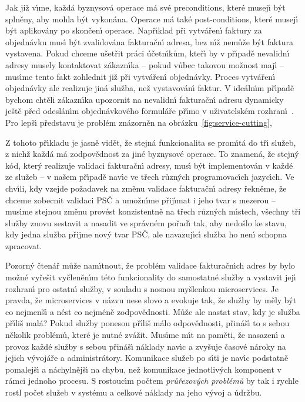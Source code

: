 Jak již v\'{\i}me, každá byznysová operace má své preconditions, které musej\'{\i} b\'yt splněny,
aby mohla b\'yt vykonána. Operace má také post-conditions, které musej\'{\i} b\'yt
aplikovány po skončen\'{\i} operace. Např\'{\i}klad při vytvářen\'{\i} faktury za
objednávku mus\'{\i} b\'yt zvalidována fakturačn\'{\i} adresa, bez n\'{\i}ž nemůže
b\'yt faktura vystavena. Pokud chceme ušetřit práci účetn\'{\i}kům, kteř\'{\i} by
v př\'{\i}padě nevalidn\'{\i} adresy musely kontaktovat zákazn\'{\i}ka – pokud vůbec
takovou možnost maj\'{\i} – mus\'{\i}me tento fakt zohlednit již při vytvářen\'{\i} objednávky.
Proces vytvářen\'{\i} objednávky ale realizuje jiná služba, než vystavován\'{\i} faktur.
V ideáln\'{\i}m př\'{\i}padě bychom chtěli zákazn\'{\i}ka upozornit na nevalidn\'{\i} fakturačn\'{\i}
adresu dynamicky ještě před odeslán\'{\i}m objednávkového formuláře př\'{\i}mo v uživatelském
rozhran\'{\i}~\cite{cemus2017separation}. Pro lepš\'{\i} představu je problém znázorněn na
obrázku~\ref{fig:service-cutting},

Z tohoto př\'{\i}kladu je jasně vidět, že stejná funkcionalita se prom\'{\i}tá
do tř\'{\i} služeb, z nichž každá má zodpovědnost za jiné byznysové operace.
To znamená, že stejn\'y kód, kter\'y realizuje validaci fakturačn\'{\i} adresy,
mus\'{\i} b\'yt implementován v každé ze služeb – v našem př\'{\i}padě nav\'{\i}c ve třech
různ\'ych programovac\'{\i}ch jazyc\'{\i}ch. Ve chv\'{\i}li, kdy vzejde požadavek na změnu
validace fakturačn\'{\i} adresy \textendash řekněme, že chceme zobecnit
validaci PSČ a umožn\'{\i}me přij\'{\i}mat i jeho tvar s mezerou – mus\'{\i}me stejnou změnu
provést konzistentně na třech různ\'ych m\'{\i}stech, všechny tři služby znovu
sestavit a nasadit ve správném pořad\'{\i} tak, aby nedošlo ke stavu,
kdy jedna služba přijme nov\'y tvar PSČ, ale navazuj\'{\i}c\'{\i} služba ho nen\'{\i}
schopna zpracovat.

Pozorn\'y čtenář může nam\'{\i}tnout, že problém validace fakturačn\'{\i}ch adres by
bylo možné vyřešit vyčleněn\'{\i}m této funkcionality
do samostatné služby a vystavit jej\'{\i} rozhran\'{\i} pro ostatn\'{\i} služby,
v souladu s nosnou myšlenkou microservices. Je pravda, že microservices
v názvu nese slovo  a evokuje tak, že služby by měly b\'yt co nejmenš\'{\i}
a nést co nejméně zodpovědnosti. Může ale nastat stav, kdy je služba př\'{\i}liš malá?
Pokud služby ponesou př\'{\i}liš málo odpovědnosti,
přináš\'{\i} to s sebou několik problémů, které je nutné zvážit. Mus\'{\i}me m\'{\i}t na paměti, že
nasazen\'{\i} a provoz každé služby s sebou přináš\'{\i} náklady nav\'{\i}c
a zvyšuje časové nároky na jejich v\'yvojáře a administrátory.
Komunikace služeb po s\'{\i}ti je nav\'{\i}c podstatně pomalejš\'{\i} a náchylnějš\'{\i} na
chybu, než komunikace jednotliv\'ych komponent v rámci jednoho procesu.
S rostouc\'{\i}m počtem \textit{průřezov\'ych problémů} by tak i rychle rostl
počet služeb v systému a celkové náklady na jeho v\'yvoj a údržbu.

